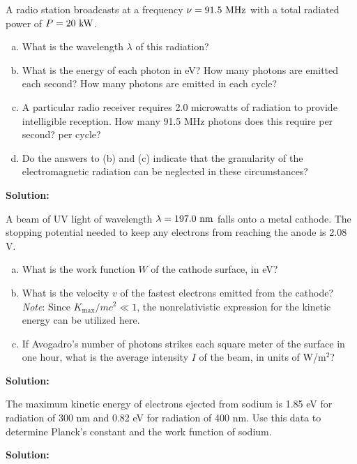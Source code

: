 \documentclass[11pt]{article}
\newcommand{\be}{\begin{enumerate}[a) ]}
\newcommand{\ee}{\end{enumerate}}
\begin{document}
\clearpage

\begin{problem}[Townsend (P1.4) \P]
A radio station broadcasts at a frequency $\nu = 91.5~\mathrm{MHz}$ with a total radiated power of $P = 20~\mathrm{kW}$.
\be
\item What is the wavelength $\lambda$ of this radiation?
\item What is the energy of each photon in eV? How many photons are emitted each second? How
many photons are emitted in each cycle?
\item A particular radio receiver requires 2.0 microwatts of radiation to provide intelligible reception.
How many 91.5 MHz photons does this require per second? per cycle?
\item  Do the answers to (b) and (c) indicate that the granularity of the electromagnetic radiation
can be neglected in these circumstances?
\ee
\end{problem}


\textbf{Solution:}\\

\clearpage

\begin{problem}
A beam of UV light of wavelength $\lambda = 197.0~\mathrm{nm}$ falls onto a metal cathode. The stopping potential
needed to keep any electrons from reaching the anode is 2.08 V.
\be
\item What is the work function $W$ of the cathode surface, in eV?
\item What is the velocity $v$ of the fastest electrons emitted from the cathode? \textit{Note}: Since
$K_{\text{max}}/mc^2 \ll 1$, the nonrelativistic expression for the kinetic energy can be utilized here.
\item If Avogadro's number of photons strikes each square meter of the surface in one hour, what
is the average intensity $I$ of the beam, in units of W/$\text{m}^2$?
\ee
\end{problem}


\textbf{Solution:}\\

\clearpage

\begin{problem}
The maximum kinetic energy of electrons ejected from sodium is 1.85 eV for radiation of 300 nm
and 0.82 eV for radiation of 400 nm. Use this data to determine Planck's constant and the work
function of sodium.
\end{problem}


\textbf{Solution:}\\

\clearpage
\end{document}
